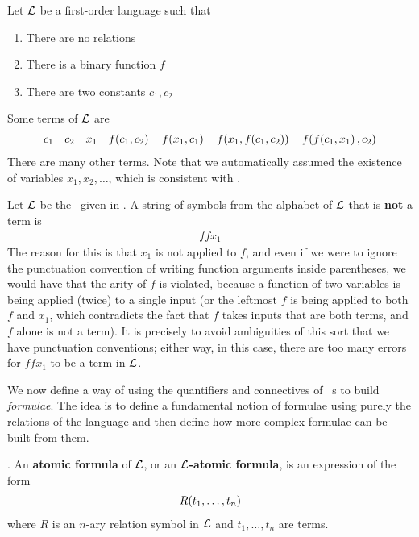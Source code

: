 \begin{boxexample}\label{Ch2:Eg:Terms_FO_Logic}
    Let $\mathcal{L}$ be a first-order language such that
    \begin{enumerate}
        \item There are no relations
        \item There is a binary function $f$
        \item There are two constants $c_1, c_2$
    \end{enumerate}
    Some terms of $\mathcal{L}$ are
    \begin{align*}
        c_1 \quad c_2 \quad x_1 \quad f\!\left( c_1, c_2 \right) \quad f\!\left( x_1, c_1 \right) \quad f\!\left( x_1, f\!\left( c_1, c_2 \right) \right) \quad f\!\left( f\!\left( c_1, x_1 \right), c_2 \right)
    \end{align*}
    There are many other terms. Note that we automatically assumed the existence of variables $x_1, x_2, \ldots$, which is consistent with . 
\end{boxexample}
\begin{boxnexample}
    Let $\mathcal{L}$ be the \fola\ given in . A string of symbols from the alphabet of $\mathcal{L}$ that is \textbf{not} a term is
    \begin{align*}
        f f x_1
    \end{align*}
    The reason for this is that $x_1$ is not applied to $f$, and even if we were to ignore the punctuation convention of writing function arguments inside parentheses, we would have that the arity of $f$ is violated, because a function of two variables is being applied (twice) to a single input (or the leftmost $f$ is being applied to both $f$ and $x_1$, which contradicts the fact that $f$ takes inputs that are both terms, and $f$ alone is not a term). It is precisely to avoid ambiguities of this sort that we have punctuation conventions; either way, in this case, there are too many errors for $f f x_1$ to be a term in $\mathcal{L}$.
\end{boxnexample}

We now define a way of using the quantifiers and connectives of \fola~s to build \textit{formulae}. The idea is to define a fundamental notion of formulae using purely the relations of the language and then define how more complex formulae can be built from them.

\begin{boxdefinition}
    \Letla. An \textbf{atomic formula} of $\mathcal{L}$, or an \textbf{$\mathcal{L}$-atomic formula}, is an expression of the form
    \begin{align*}
        R\!\left( t_1, \ldots, t_n \right)
    \end{align*}
    where $R$ is an $n$-ary relation symbol in $\mathcal{L}$ and $t_1, \ldots, t_n$ are terms.
\end{boxdefinition}


